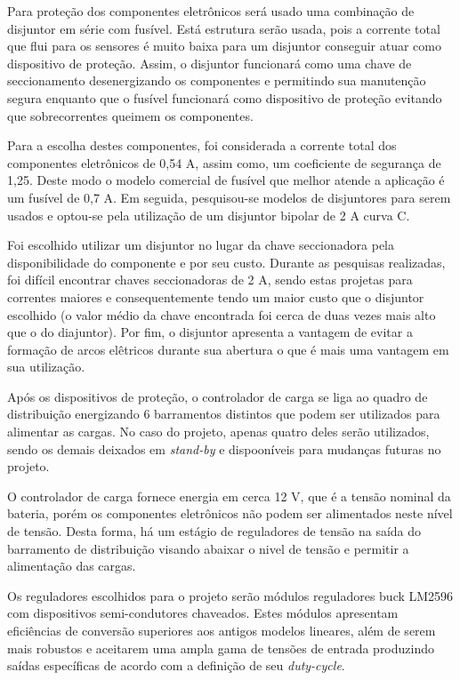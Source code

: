 Para proteção dos componentes eletrônicos será usado uma combinação de disjuntor em série com fusível. Está estrutura serão usada, pois a corrente total que flui para os sensores é muito baixa para um disjuntor conseguir atuar como dispositivo de proteção. Assim, o disjuntor funcionará como uma chave de seccionamento desenergizando os componentes e permitindo sua manutenção segura enquanto que o fusível funcionará como dispositivo de proteção evitando que sobrecorrentes queimem os componentes. 

Para a escolha destes componentes, foi considerada a corrente total dos componentes eletrônicos de 0,54 A, assim como, um coeficiente de segurança de 1,25. Deste modo o modelo comercial de fusível que melhor atende a aplicação é um fusível de 0,7 A. Em seguida, pesquisou-se modelos de disjuntores para serem usados e optou-se pela utilização de um disjuntor bipolar de 2 A curva C.

Foi escolhido utilizar um disjuntor no lugar da chave seccionadora pela disponibilidade do componente e por seu custo. Durante as pesquisas realizadas, foi difícil encontrar chaves seccionadoras de 2 A, sendo estas projetas para correntes maiores e consequentemente tendo um maior custo que o disjuntor escolhido (o valor médio da chave encontrada foi cerca de duas vezes mais alto que o do diajuntor). Por fim, o disjuntor apresenta a vantagem de evitar a formação de arcos elêtricos durante sua abertura o que é mais uma vantagem em sua utilização.

Após os dispositivos de proteção, o controlador de carga se liga ao quadro de distribuição energizando 6 barramentos distintos que podem ser utilizados para alimentar as cargas. No caso do projeto, apenas quatro deles serão utilizados, sendo os demais deixados em \textit{stand-by} e dispooníveis para mudanças futuras no projeto.

O controlador de carga fornece energia em cerca 12 V, que é a tensão nominal da bateria, porém os componentes eletrônicos não podem ser alimentados neste nível de tensão. Desta forma, há um estágio de reguladores de tensão na saída do barramento de distribuição visando abaixar o nivel de tensão e permitir a alimentação das cargas.

Os reguladores escolhidos para o projeto serão módulos reguladores buck LM2596 com dispositivos semi-condutores chaveados. Estes módulos apresentam eficiências de conversão superiores aos antigos modelos lineares, além de serem mais robustos e aceitarem uma ampla gama de tensões de entrada produzindo saídas específicas de acordo com a definição de seu \textit{duty-cycle}.

